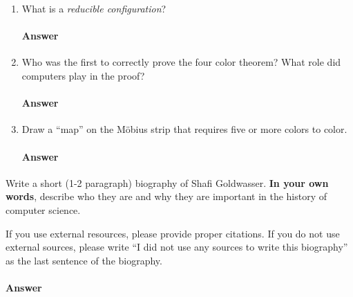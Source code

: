 \documentclass{article}
\begin{document}
\begin{enumerate}

    \item What is a \emph{reducible configuration}?

        \paragraph{Answer}




    \item Who was the first to correctly prove the four color theorem?  What
        role did computers play in the proof?

        \paragraph{Answer}





    \item Draw a ``map'' on the M\"obius strip that requires five or more colors
        to color.

        \paragraph{Answer}



\end{enumerate}

\collab{\todo{}}

Write a short (1-2 paragraph) biography of Shafi Goldwasser.
\textbf{In your own words}, describe who they are and why they are important in
the history of computer science.

If you use external resources, please provide
proper citations. If you do not use external sources, please write ``I did not
use any sources to write this biography'' as the last sentence of the
biography.

\paragraph{Answer}


% 
% 
\end{document}
